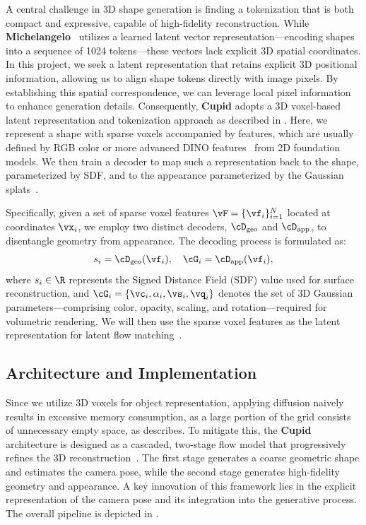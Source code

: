 \documentclass[../../book-main.tex]{subfiles}
\begin{document}
A central challenge in 3D shape generation is finding a tokenization that is both compact and expressive, capable of high-fidelity reconstruction.
While \textbf{Michelangelo}~\citep{zhao2023michelangelo} utilizes a learned latent vector representation---encoding shapes into a sequence of 1024 tokens---these vectors lack explicit 3D spatial coordinates.
In this project, we seek a latent representation that retains explicit 3D positional information, allowing us to align shape tokens directly with image pixels.
By establishing this spatial correspondence, we can leverage local pixel information to enhance generation details.
Consequently, \textbf{Cupid} adopts a 3D voxel-based latent representation and tokenization approach as described in .
Here, we represent a shape with sparse voxels accompanied by features, which are usually defined by RGB color or more advanced DINO features~\citep{DINOv2} from 2D foundation models.
We then train a decoder to map such a representation back to the shape, parameterized by SDF, and to the appearance parameterized by the Gaussian splats~\citep{kerbl20233d}.

Specifically, given a set of sparse voxel features \(\vF = \{\vf_{i}\}_{i=1}^{N}\) located at coordinates \(\vx_{i}\), we employ two distinct decoders, \(\cD_{\mathrm{geo}}\) and \(\cD_{\mathrm{app}}\), to disentangle geometry from appearance.
The decoding process is formulated as:
\begin{equation}
s_{i} = \cD_{\mathrm{geo}}(\vf_{i}), \quad \cG_{i} = \cD_{\mathrm{app}}(\vf_{i}) ,
\end{equation}
where \(s_{i} \in \R\) represents the Signed Distance Field (SDF) value used for surface reconstruction, and \(\cG_{i} = \{\vc_{i}, \alpha_{i}, \vs_{i}, \vq_{i}\}\) denotes the set of 3D Gaussian parameters---comprising color, opacity, scaling, and rotation---required for volumetric rendering.
We will then use the sparse voxel features as the latent representation for latent flow matching~\citep{rombach2022high}.

\subsection{Architecture and Implementation}
\label{sub:3d_reconstruction_architecture}
Since we utilize 3D voxels for object representation, applying diffusion naively results in excessive memory consumption, as a large portion of the grid consists of unnecessary empty space, as  describes.
To mitigate this, the \textbf{Cupid} architecture is designed as a cascaded, two-stage flow model that progressively refines the 3D reconstruction~\citep{xiang2025structured}.
The first stage generates a coarse geometric shape and estimates the camera pose, while the second stage generates high-fidelity geometry and appearance.
A key innovation of this framework lies in the explicit representation of the camera pose and its integration into the generative process.
The overall pipeline is depicted in .
\end{document}
